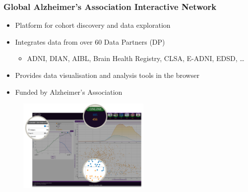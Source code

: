 \documentclass[10pt,xcolor=table]{beamer}
\begin{document}
\begin{frame}
\frametitle{Global Alzheimer's Association Interactive Network}

\begin{itemize}
 \item Platform for cohort discovery and data exploration
 \item Integrates data from over 60 Data Partners (DP)
 \begin{itemize}
  \item ADNI, DIAN, AIBL, Brain Health Registry, CLSA,  E-ADNI, EDSD, \dots
 \end{itemize}
 \item Provides data visualisation and analysis tools in the browser
 \item Funded by Alzheimer's Association
\end{itemize}

\begin{figure}
\centering
\includegraphics[height=4.5cm,right]{interrogator.png}   
\end{figure}

\end{frame}

% 
% 
% 
% 

\fontsize{6pt}{7.2}\selectfont
{}
\end{document}
